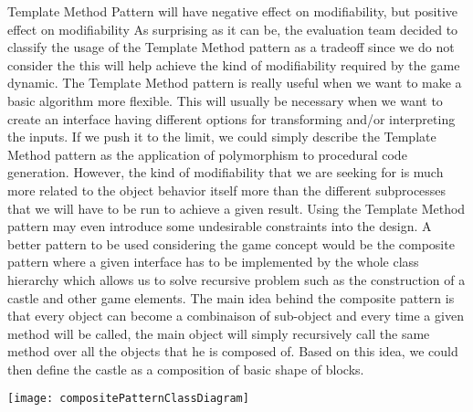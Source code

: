 \begin{description}[style=nextline]
  \item[T2\label{t2}] Template Method Pattern will have negative effect on modifiability, but positive effect on modifiability
    \vspace{\baselineskip}
    \newline
    As surprising as it can be, the evaluation team decided to classify the usage of the Template Method pattern as a tradeoff since we do not consider the this will help achieve the kind of modifiability required by the game dynamic.
    \newline
    \vspace{\baselineskip}
    The Template Method pattern is really useful when we want to make a basic algorithm more flexible. This will usually be necessary when we want to create an interface having different options for transforming and/or interpreting the inputs. If we push it to the limit, we could simply describe the Template Method pattern as the application of polymorphism to procedural code generation. \cite{wiki:templateMethod}
    \newline
    \vspace{\baselineskip}
    However, the kind of modifiability that we are seeking for is much more related to the object behavior itself more than the different subprocesses that we will have to be run to achieve a given result. Using the Template Method pattern may even introduce some undesirable constraints into the design.
    \newline
    \vspace{\baselineskip}
    A better pattern to be used considering the game concept would be the composite pattern where a given interface has to be implemented by the whole class hierarchy which allows us to solve recursive problem such as the construction of a castle and other game elements. The main idea behind the composite pattern is that every object can become a combinaison of sub-object and every time a given method will be called, the main object will simply recursively call the same method over all the objects that he is composed of. Based on this idea, we could then define the castle as a composition of basic shape of blocks. \cite{wiki:composite}
    \begin{center}
      \texttt{[image: compositePatternClassDiagram]}
    \end{center}
\end{description}
